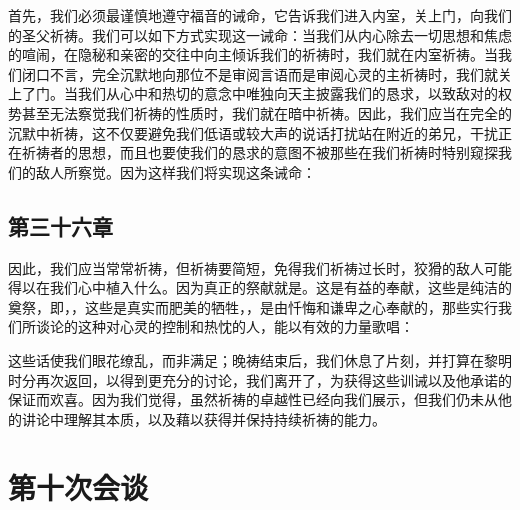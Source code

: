 首先，我们必须最谨慎地遵守福音的诫命，它告诉我们进入内室，关上门，向我们的圣父祈祷。我们可以如下方式实现这一诫命：当我们从内心除去一切思想和焦虑的喧闹，在隐秘和亲密的交往中向主倾诉我们的祈祷时，我们就在内室祈祷。当我们闭口不言，完全沉默地向那位不是审阅言语而是审阅心灵的主祈祷时，我们就关上了门。当我们从心中和热切的意念中唯独向天主披露我们的恳求，以致敌对的权势甚至无法察觉我们祈祷的性质时，我们就在暗中祈祷。因此，我们应当在完全的沉默中祈祷，这不仅要避免我们低语或较大声的说话打扰站在附近的弟兄，干扰正在祈祷者的思想，而且也要使我们的恳求的意图不被那些在我们祈祷时特别窥探我们的敌人所察觉。因为这样我们将实现这条诫命： \par


\subsection{第三十六章}

\par

因此，我们应当常常祈祷，但祈祷要简短，免得我们祈祷过长时，狡猾的敌人可能得以在我们心中植入什么。因为真正的祭献就是。这是有益的奉献，这些是纯洁的奠祭，即，，这些是真实而肥美的牺牲，，是由忏悔和谦卑之心奉献的，那些实行我们所谈论的这种对心灵的控制和热忱的人，能以有效的力量歌唱：\par

这些话使我们眼花缭乱，而非满足；晚祷结束后，我们休息了片刻，并打算在黎明时分再次返回，以得到更充分的讨论，我们离开了，为获得这些训诫以及他承诺的保证而欢喜。因为我们觉得，虽然祈祷的卓越性已经向我们展示，但我们仍未从他的讲论中理解其本质，以及藉以获得并保持持续祈祷的能力。\par



\section{第十次会谈}

